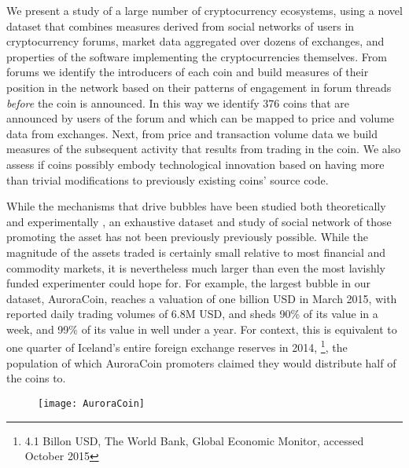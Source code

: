 
We present a study of a large number of cryptocurrency ecosystems, 
using a novel dataset that combines measures derived from social networks of users in cryptocurrency forums, market data aggregated over dozens of exchanges, and properties of the software implementing the cryptocurrencies themselves.
From forums we identify the introducers of each coin and build measures of their position in the network based on
their patterns of engagement in forum threads
\emph{before} the coin is announced.
In this way we identify 376 coins that are announced by users of the forum and which can be mapped to price and volume data from exchanges.
Next, from price and transaction volume data we build measures of the subsequent activity that results from trading in the coin. 
We also assess if coins possibly embody technological innovation based on having more than trivial modifications to previously existing coins' source code.

While the mechanisms that drive bubbles have been studied both theoretically 
\cite{abolafia1988enacting, earl2007decision, bakker2010social, harras2011grow}
and experimentally
\cite{moinas2013bubble},
an exhaustive dataset and study of social network of those promoting the asset has not been previously previously possible.
While the magnitude of the assets traded is certainly small relative to most financial and commodity markets, it is nevertheless much larger than
even the most lavishly funded experimenter could hope for.
For example, the largest bubble in our dataset, AuroraCoin, reaches a valuation of one billion USD in March 2015,
with reported daily trading volumes of 6.8M USD, and sheds 90\% of its value in a week, and 99\% of its value in well under a year.
For context, this is equivalent to one quarter of Iceland's entire foreign exchange reserves in 2014, \footnote{4.1 Billon USD, The World Bank, Global Economic Monitor, accessed October 2015}, the population of which AuroraCoin promoters claimed they would distribute half of the coins to.

\begin{figure}
\texttt{[image: AuroraCoin]}
\end{figure}

